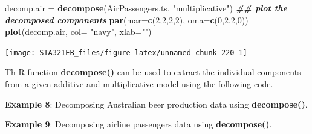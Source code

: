 \documentclass[
]{book}
\newenvironment{Shaded}{\begin{snugshade}}{\end{snugshade}}
\newcommand{\AttributeTok}[1]{\textcolor[rgb]{0.13,0.29,0.53}{#1}}
\newcommand{\CommentTok}[1]{\textcolor[rgb]{0.56,0.35,0.01}{\textit{#1}}}
\newcommand{\DecValTok}[1]{\textcolor[rgb]{0.00,0.00,0.81}{#1}}
\newcommand{\DocumentationTok}[1]{\textcolor[rgb]{0.56,0.35,0.01}{\textbf{\textit{#1}}}}
\newcommand{\FunctionTok}[1]{\textcolor[rgb]{0.13,0.29,0.53}{\textbf{#1}}}
\newcommand{\NormalTok}[1]{#1}
\newcommand{\OtherTok}[1]{\textcolor[rgb]{0.56,0.35,0.01}{#1}}
\newcommand{\SpecialCharTok}[1]{\textcolor[rgb]{0.81,0.36,0.00}{\textbf{#1}}}
\newcommand{\StringTok}[1]{\textcolor[rgb]{0.31,0.60,0.02}{#1}}
\begin{document}
\begin{Shaded}
\begin{Highlighting}[]
\NormalTok{decomp.air }\OtherTok{=} \FunctionTok{decompose}\NormalTok{(AirPassengers.ts, }\StringTok{"multiplicative"}\NormalTok{)}
\DocumentationTok{\#\# plot the decomposed components}
\FunctionTok{par}\NormalTok{(}\AttributeTok{mar=}\FunctionTok{c}\NormalTok{(}\DecValTok{2}\NormalTok{,}\DecValTok{2}\NormalTok{,}\DecValTok{2}\NormalTok{,}\DecValTok{2}\NormalTok{), }\AttributeTok{oma=}\FunctionTok{c}\NormalTok{(}\DecValTok{0}\NormalTok{,}\DecValTok{2}\NormalTok{,}\DecValTok{2}\NormalTok{,}\DecValTok{0}\NormalTok{))}
\FunctionTok{plot}\NormalTok{(decomp.air, }\AttributeTok{col=} \StringTok{"navy"}\NormalTok{, }\AttributeTok{xlab=}\StringTok{""}\NormalTok{)}
\end{Highlighting}
\end{Shaded}

\begin{center}\texttt{[image: STA321EB\_files/figure-latex/unnamed-chunk-220-1]} \end{center}

Th R function \textbf{decompose()} can be used to extract the individual components from a given additive and multiplicative model using the following code.

\textbf{Example 8}: Decomposing Australian beer production data using \textbf{decompose()}.

\begin{Shaded}
\end{Shaded}

\textbf{Example 9}: Decomposing airline passengers data using \textbf{decompose()}.

\begin{Shaded}
\end{Shaded}
\end{document}
